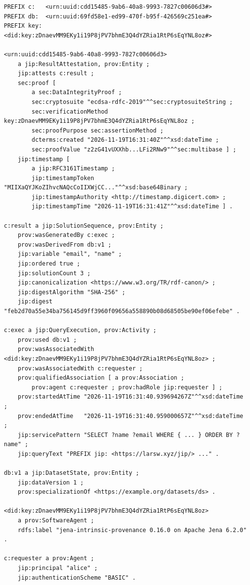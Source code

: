 \documentclass[11pt,a4paper]{article}
\begin{document}
\begin{lstlisting}[language=Turtle, caption={An attestation from the demo, with prefixes added and long literals shortened.}, label={lst:attestation}]
PREFIX c:   <urn:uuid:cdd15485-9ab6-40a8-9993-7827c00606d3#>
PREFIX db:  <urn:uuid:69fd58e1-ed99-470f-b95f-426569c251ea#>
PREFIX key: <did:key:zDnaevMM9EKy1i19P8jPV7bhmE3Q4dYZRia1RtP6sEqYNL8oz#>

<urn:uuid:cdd15485-9ab6-40a8-9993-7827c00606d3>
    a jip:ResultAttestation, prov:Entity ;
    jip:attests c:result ;
    sec:proof [
        a sec:DataIntegrityProof ;
        sec:cryptosuite "ecdsa-rdfc-2019"^^sec:cryptosuiteString ;
        sec:verificationMethod key:zDnaevMM9EKy1i19P8jPV7bhmE3Q4dYZRia1RtP6sEqYNL8oz ;
        sec:proofPurpose sec:assertionMethod ;
        dcterms:created "2026-11-19T16:31:40Z"^^xsd:dateTime ;
        sec:proofValue "z2zG41vUXXhb...LFi2RNw9"^^sec:multibase ] ;
    jip:timestamp [
        a jip:RFC3161Timestamp ;
        jip:timestampToken "MIIXaQYJKoZIhvcNAQcCoIIXWjCC..."^^xsd:base64Binary ;
        jip:timestampAuthority <http://timestamp.digicert.com> ;
        jip:timestampTime "2026-11-19T16:31:41Z"^^xsd:dateTime ] .

c:result a jip:SolutionSequence, prov:Entity ;
    prov:wasGeneratedBy c:exec ;
    prov:wasDerivedFrom db:v1 ;
    jip:variable "email", "name" ;
    jip:ordered true ;
    jip:solutionCount 3 ;
    jip:canonicalization <https://www.w3.org/TR/rdf-canon/> ;
    jip:digestAlgorithm "SHA-256" ;
    jip:digest "feb2d70a55e34ba756145d9ff3960f09656a558890b08d68505be90ef06efebe" .

c:exec a jip:QueryExecution, prov:Activity ;
    prov:used db:v1 ;
    prov:wasAssociatedWith <did:key:zDnaevMM9EKy1i19P8jPV7bhmE3Q4dYZRia1RtP6sEqYNL8oz> ;
    prov:wasAssociatedWith c:requester ;
    prov:qualifiedAssociation [ a prov:Association ;
        prov:agent c:requester ; prov:hadRole jip:requester ] ;
    prov:startedAtTime "2026-11-19T16:31:40.939694267Z"^^xsd:dateTime ;
    prov:endedAtTime   "2026-11-19T16:31:40.959000657Z"^^xsd:dateTime ;
    jip:servicePattern "SELECT ?name ?email WHERE { ... } ORDER BY ?name" ;
    jip:queryText "PREFIX jip: <https://larsw.xyz/jip/> ..." .

db:v1 a jip:DatasetState, prov:Entity ;
    jip:dataVersion 1 ;
    prov:specializationOf <https://example.org/datasets/ds> .

<did:key:zDnaevMM9EKy1i19P8jPV7bhmE3Q4dYZRia1RtP6sEqYNL8oz>
    a prov:SoftwareAgent ;
    rdfs:label "jena-intrinsic-provenance 0.16.0 on Apache Jena 6.2.0" .

c:requester a prov:Agent ;
    jip:principal "alice" ;
    jip:authenticationScheme "BASIC" .
\end{lstlisting}
\end{document}
